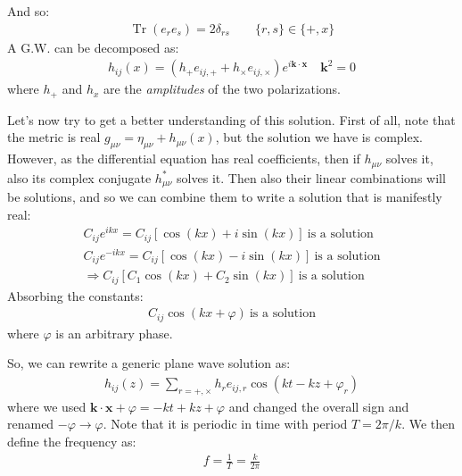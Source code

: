 \documentclass[../template.tex]{subfiles}
\begin{document}
And so:
\begin{align*}
    \operatorname{Tr}(e_r e_s) = 2 \delta_{rs} \qquad \{r,s\} \in \{+,x\} 
\end{align*}
A G.W. can be decomposed as:
\begin{align*}
    h_{ij} (x) = (h_+ e_{ij,+} + h_\times e_{ij,\times}) e^{i\bm{k} \cdot \bm{x}} \quad \bm{k}^2 = 0
\end{align*}
where $h_+$ and $h_x$ are the \textit{amplitudes} of the two polarizations. 

\medskip
Let's now try to get a better understanding of this solution. First of all, note that the metric is real $g_{\mu \nu} = \eta_{\mu \nu} + h_{\mu \nu}(x)$, but the solution we have is complex. However, as the differential equation has real coefficients, then if $h_{\mu \nu}$ solves it, also its complex conjugate $h^*_{\mu \nu}$ solves it. Then also their linear combinations will be solutions, and so we can combine them to write a solution that is manifestly real:
\begin{align*}
    C_{ij} e^{ikx} = C_{ij} [\cos(kx) + i\sin(kx)] \> \text{is a solution}\\
    C_{ij} e^{-ikx} = C_{ij} [\cos(kx) - i \sin(kx)] \> \text{is a solution}\\
    \Rightarrow C_{ij}[C_1 \cos(kx) + C_2 \sin(kx)]\> \text{is a solution}
\end{align*}
Absorbing the constants:
\begin{align*}
    C_{ij} \cos(kx + \varphi) \> \text{is a solution}
\end{align*}
where $\varphi$ is an arbitrary phase.

So, we can rewrite a generic plane wave solution as:
\begin{align*}
    h_{ij}(z) = \sum_{r = +,\times} h_r e_{ij,r} \cos(kt - kz + \varphi_r)
\end{align*}
where we used $\bm{k} \cdot \bm{x} + \varphi = -kt + kz + \varphi$ and changed the overall sign and renamed $-\varphi \to \varphi$. Note that it is periodic in time with period $T= 2\pi/k$. We then define the frequency as:
\begin{align*}
    f = \frac{1}{T} = \frac{k}{2 \pi}  
\end{align*}
\end{document}
